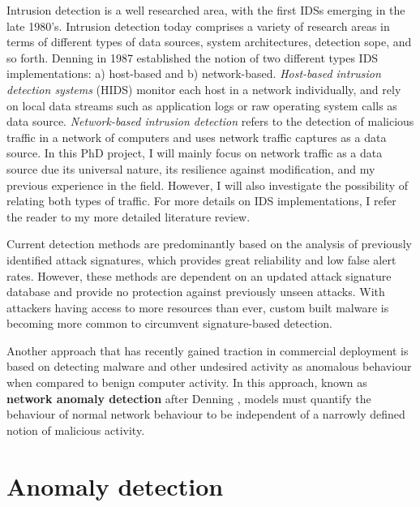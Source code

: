 \documentclass[a4paper,12pt,twoside]{report}
\begin{document}
Intrusion detection is a well researched area, with the first IDSs emerging in the late 1980's. Intrusion detection today comprises a variety of research areas in terms of different types of data sources, system architectures, detection sope, and so forth. Denning \cite{denning1987intrusion} in 1987 established the notion of two different types IDS implementations: a) host-based and b) network-based. 
\textit{Host-based intrusion detection systems} (HIDS) monitor each host in a network individually, and rely on local data streams such as application logs or raw operating system calls as  data source. \textit{Network-based intrusion detection} refers to the detection of malicious traffic in a network of computers and uses network traffic captures as a data source. In this PhD project, I will mainly focus on network traffic as a data source due its universal nature, its resilience against modification, and my previous experience in the field. However, I will also investigate the possibility of relating both types of traffic. For more details on IDS implementations, I refer the reader to my more detailed literature review. 


Current detection methods are predominantly based on the analysis of previously identified attack signatures, which provides great reliability and low false alert rates. However, these methods are dependent on an updated attack signature database and provide no protection against previously unseen attacks. With attackers having access to more resources than ever, custom built malware is becoming more common to circumvent signature-based detection. 

Another approach that has recently gained traction in commercial deployment is based on detecting malware and other undesired activity as anomalous behaviour when compared to benign computer activity. In this approach, known as \textbf{network anomaly detection} after Denning \citep{denning1987intrusion}, models must quantify the behaviour of normal network behaviour to be independent of a narrowly defined notion of malicious activity.



\section{Anomaly detection}
\end{document}
